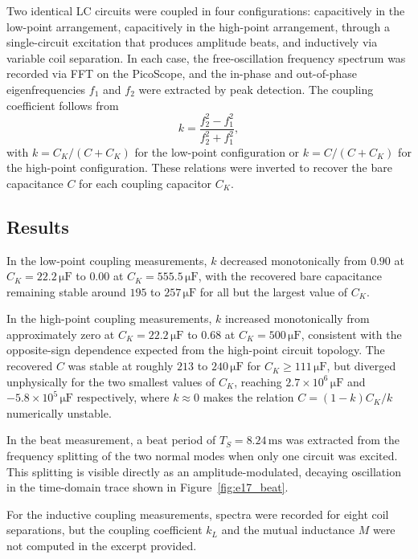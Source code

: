 \documentclass[a4paper, 10pt]{article}
\newcommand{\uF}{\si{\micro\farad}}
\begin{document}
Two identical LC circuits were coupled in four configurations: capacitively
in the low-point arrangement, capacitively in the high-point arrangement,
through a single-circuit excitation that produces amplitude beats, and
inductively via variable coil separation. In each case, the free-oscillation
frequency spectrum was recorded via FFT on the PicoScope, and the in-phase
and out-of-phase eigenfrequencies $f_1$ and $f_2$ were extracted by peak
detection. The coupling coefficient follows from
\begin{equation}
  k = \frac{f_2^2 - f_1^2}{f_2^2 + f_1^2},
  \label{eq:coupling_coeff}
\end{equation}
with $k = C_K/(C+C_K)$ for the low-point configuration or
$k = C/(C+C_K)$ for the high-point configuration. These relations were
inverted to recover the bare capacitance $C$ for each coupling capacitor
$C_K$.

\subsection{Results}

In the low-point coupling measurements, $k$ decreased monotonically from
$0.90$ at $C_K = 22.2\,\uF$ to $0.00$ at $C_K = 555.5\,\uF$,
with the recovered bare capacitance remaining stable around
$195$ to $257\,\uF$ for all but the largest value of $C_K$.

In the high-point coupling measurements, $k$ increased monotonically from
approximately zero at $C_K = 22.2\,\uF$ to $0.68$ at
$C_K = 500\,\uF$, consistent with the opposite-sign dependence
expected from the high-point circuit topology. The recovered $C$ was stable
at roughly $213$ to $240\,\uF$ for $C_K \geq 111\,\uF$, but
diverged unphysically for the two smallest values of $C_K$, reaching
$2.7\times10^{6}\,\uF$ and $-5.8\times10^{5}\,\uF$
respectively, where $k \approx 0$ makes the relation
$C = (1-k)C_K/k$ numerically unstable.

In the beat measurement, a beat period of $T_S = 8.24\,\text{ms}$ was
extracted from the frequency splitting of the two normal modes when only
one circuit was excited. This splitting is visible directly as an
amplitude-modulated, decaying oscillation in the time-domain trace shown in
Figure~\ref{fig:e17_beat}.

For the inductive coupling measurements, spectra were recorded for eight
coil separations, but the coupling coefficient $k_L$ and the mutual
inductance $M$ were not computed in the excerpt provided.
\end{document}

